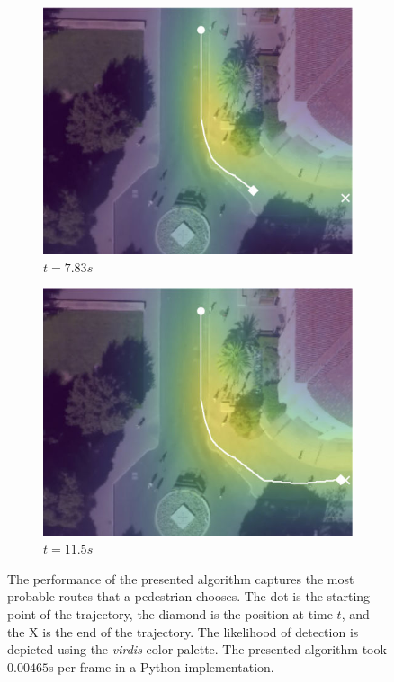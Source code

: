 \documentclass[letterpaper,10pt,conference]{ieeeconf}
\begin{document}
\begin{figure}
	\begin{subfigure}[b]{.45\linewidth}
		\includegraphics[width=\linewidth]{./figures/FirstPage/gates_1_2_t=235.jpg}
		\caption{$t=7.83s$}
	\end{subfigure}
	\begin{subfigure}[b]{.45\linewidth}
		\includegraphics[width=\linewidth]{./figures/FirstPage/gates_1_2_t=345.jpg}
		\caption{$t=11.5s$}
	\end{subfigure}
	\caption{The performance of the presented algorithm captures the most probable routes that a pedestrian chooses. The dot is the starting point of the trajectory, the diamond is the position at time $t$, and the X is the end of the trajectory. The likelihood of detection is depicted using the \textit{virdis} color palette. The presented algorithm took $0.00465$s per frame in a Python implementation. }
	\label{fig:gates-1-2}
	\vspace*{-0.7cm}
\end{figure}
\end{document}
